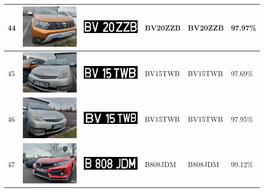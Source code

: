 \documentclass[a4paper,12pt]{report}
\begin{document}
\begin{longtable}{| m{0.6cm} | m{3cm} | m{3cm} | m{1.8cm} | m{1.8cm} | m{1.8cm} |}
    44  & \includegraphics[width=3cm,keepaspectratio]{dataset/25_s1.jpg}  & \includegraphics[width=3cm,keepaspectratio]{segmentari/44.jpg}  & BV20ZZB             & BV20ZZB              & 97.97\%    \\ \hline
    45  & \includegraphics[width=3cm,keepaspectratio]{dataset/26_d1.jpg}  & \includegraphics[width=3cm,keepaspectratio]{segmentari/45.jpg}  & BV15TWB             & BV15TWB              & 97.69\%    \\ \hline
    46  & \includegraphics[width=3cm,keepaspectratio]{dataset/26_s1.jpg}  & \includegraphics[width=3cm,keepaspectratio]{segmentari/46.jpg}  & BV15TWB             & BV15TWB              & 97.95\%    \\ \hline
    47  & \includegraphics[width=3cm,keepaspectratio]{dataset/27_d1.jpg}  & \includegraphics[width=3cm,keepaspectratio]{segmentari/47.jpg}  & B808JDM             & B808JDM              & 99.12\%    \\ \hline

\end{longtable}
\end{document}
